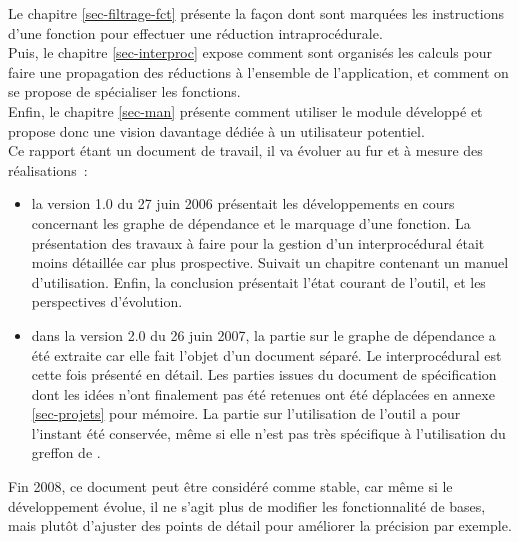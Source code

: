 Le chapitre \ref{sec-filtrage-fct} présente
la façon dont sont marquées les instructions d'une fonction pour
effectuer une réduction intraprocédurale.\\

Puis, le chapitre \ref{sec-interproc} expose comment sont organisés les calculs
pour faire une propagation des réductions à l'ensemble de l'application,
et comment on se propose de spécialiser les fonctions.\\

Enfin, le chapitre \ref{sec-man} présente comment utiliser le module
développé et propose donc une vision davantage dédiée à un utilisateur
potentiel.\\


Ce rapport étant un document de travail, il va évoluer au fur et à mesure des
réalisations~:
\begin{itemize}
  \item la version 1.0 du 27 juin 2006 présentait
les développements en cours concernant les graphe de dépendance
et le marquage d'une fonction. La présentation des travaux à faire
pour la gestion d'un \slicing interprocédural était moins détaillée car
plus prospective. Suivait un chapitre contenant un manuel d'utilisation.
Enfin, la conclusion présentait l'état courant de l'outil,
et les perspectives d'évolution.
\item dans la version 2.0 du 26 juin 2007, la partie sur le graphe de
  dépendance a été extraite car elle fait l'objet d'un document séparé.
  Le \slicing interprocédural est cette fois présenté en détail.
  Les parties issues du document de spécification dont les idées
  n'ont finalement pas été retenues ont été déplacées en annexe
  \ref{sec-projets} pour mémoire. La partie sur l'utilisation de l'outil
  a pour l'instant été conservée, même si elle n'est pas très spécifique à
  l'utilisation du greffon de \slicing.
\end{itemize}

Fin 2008, ce document peut être considéré comme stable,
car même si le développement évolue, il ne s'agit plus de modifier les
fonctionnalité de bases, mais plutôt d'ajuster des points de détail pour
améliorer la précision par exemple.
